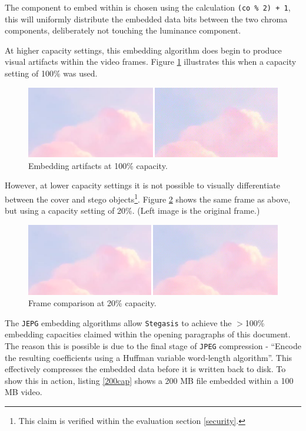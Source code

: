 \documentclass[paper=a4, fontsize=11pt,twoside]{scrartcl}    %
\numberwithin{table}{section}
\numberwithin{figure}{section}
\numberwithin{algorithm}{section}
\begin{document}
The component to embed within is chosen using the calculation \texttt{(co \% 2) + 1}, this will uniformly distribute the embedded data bits between the two chroma components, deliberately not touching the luminance component. 

At higher capacity settings, this embedding algorithm does begin to produce visual artifacts within the video frames. Figure \ref{jpegarti} illustrates this when a capacity setting of 100\% was used.

\begin{figure}[!h]
\centerline{\includegraphics[width=\textwidth]{images/bb_100cap.png}}
\caption{Embedding artifacts at 100\% capacity.}
\label{jpegarti}
\end{figure}

However, at lower capacity settings it is not possible to visually differentiate between the cover and stego objects\footnote{This claim is verified within the evaluation section \ref{security}.}. Figure \ref{jpegnoart} shows the same frame as above, but using a capacity setting of 20\%. (Left image is the original frame.)

\begin{figure}[!h]
\centerline{\includegraphics[width=\textwidth]{images/bb_20cap.png}}
\caption{Frame comparison at 20\% capacity.}
\label{jpegnoart}
\end{figure}

\noindent
The \texttt{JEPG} embedding algorithms allow \texttt{Stegasis} to achieve the $>$100\% embedding capacities claimed within the opening paragraphs of this document. The reason this is possible is due to the final stage of \texttt{JPEG} compression - ``Encode the resulting coefficients using a Huffman variable word-length algorithm''. This effectively compresses the embedded data before it is written back to disk. To show this in action, listing \ref{200cap} shows a 200 MB file embedded within a 100 MB video.
\end{document}
